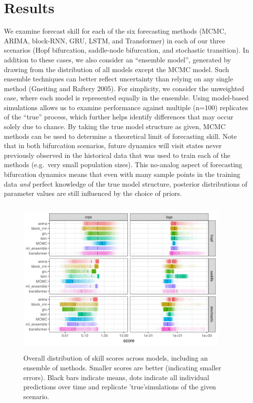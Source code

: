 \documentclass{article}
\begin{document}
\hypertarget{results}{%
\section{Results}\label{results}}

We examine forecast skill for each of the six forecasting methods (MCMC,
ARIMA, block-RNN, GRU, LSTM, and Transformer) in each of our three
scenarios (Hopf bifurcation, saddle-node bifurcation, and stochastic
transition). In addition to these cases, we also consider an ``ensemble
model'', generated by drawing from the distribution of all models except
the MCMC model. Such ensemble techniques can better reflect uncertainty
than relying on any single method (Gneiting and Raftery 2005). For
simplicity, we consider the unweighted case, where each model is
represented equally in the ensemble. Using model-based simulations
allows us to examine performance against multiple (n=100) replicates of
the ``true'' process, which further helps identify differences that may
occur solely due to chance. By taking the true model structure as given,
MCMC methods can be used to determine a theoretical limit of forecasting
skill. Note that in both bifurcation scenarios, future dynamics will
visit states never previously observed in the historical data that was
used to train each of the methods (e.g.~very small population sizes).
This no-analog aspect of forecasting bifurcation dynamics means that
even with many sample points in the training data \emph{and} perfect
knowledge of the true model structure, posterior distributions of
parameter values are still influenced by the choice of priors.

\begin{figure}
\includegraphics[width=400px,height=300px]{manuscript_files/figure-latex/figure2-1} \caption{Overall distribution of skill scores across models, including an ensemble of methods. Smaller scores are better (indicating smaller errors). Black bars indicate means, dots indicate all individual predictions over time and replicate 'true'simulations of the given scenario.}\label{fig:figure2}
\end{figure}
\end{document}

